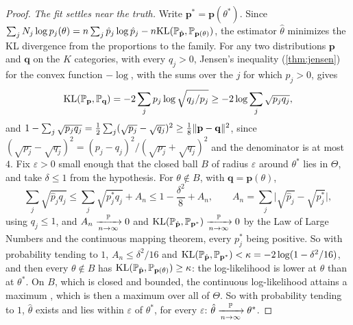 \begin{proof}
\textit{The fit settles near the truth.}
Write $\mathbf{p}^* = \mathbf{p}(\theta^*)$.
Since $\sum_jN_j\log p_j(\theta) = n\sum_j\hat{p}_j\log\hat{p}_j - n\mathrm{KL}(\mathbb{P}_{\hat{\mathbf{p}}}, \mathbb{P}_{\mathbf{p}(\theta)})$, the estimator $\hat{\theta}$ minimizes the KL divergence from the proportions to the family.
For any two distributions $\mathbf{p}$ and $\mathbf{q}$ on the $K$ categories, with every $q_j > 0$, Jensen's inequality (\cref{thm:jensen}) for the convex function $-\log$, with the sums over the $j$ for which $p_j > 0$, gives
\[
\mathrm{KL}(\mathbb{P}_{\mathbf{p}}, \mathbb{P}_{\mathbf{q}}) = -2\sum_j p_j\log\sqrt{q_j/p_j} \geq -2\log\sum_j\sqrt{p_jq_j},
\]
and $1 - \sum_j\sqrt{p_jq_j} = \frac12\sum_j(\sqrt{p_j} - \sqrt{q_j})^2 \geq \frac18\lVert\mathbf{p} - \mathbf{q}\rVert^2$, since $(\sqrt{p_j} - \sqrt{q_j})^2 = (p_j - q_j)^2/(\sqrt{p_j} + \sqrt{q_j})^2$ and the denominator is at most $4$.
Fix $\varepsilon > 0$ small enough that the closed ball $B$ of radius $\varepsilon$ around $\theta^*$ lies in $\Theta$, and take $\delta \leq 1$ from the hypothesis.
For $\theta \notin B$, with $\mathbf{q} = \mathbf{p}(\theta)$,
\[
\sum_j\sqrt{\hat{p}_jq_j} \leq \sum_j\sqrt{p^*_jq_j} + A_n \leq 1 - \frac{\delta^2}{8} + A_n, \qquad A_n = \sum_j\Big|\sqrt{\hat{p}_j} - \sqrt{p^*_j}\Big|,
\]
using $q_j \leq 1$, and $A_n \xrightarrow [n \to \infty ]{\mathbb{P}} 0$ and $\mathrm{KL}(\mathbb{P}_{\hat{\mathbf{p}}}, \mathbb{P}_{\mathbf{p}^*}) \xrightarrow [n \to \infty ]{\mathbb{P}} 0$ by the Law of Large Numbers and the continuous mapping theorem, every $p^*_j$ being positive.
So with probability tending to $1$, $A_n \leq \delta^2/16$ and $\mathrm{KL}(\mathbb{P}_{\hat{\mathbf{p}}}, \mathbb{P}_{\mathbf{p}^*}) < \kappa = -2\log(1 - \delta^2/16)$, and then every $\theta \notin B$ has $\mathrm{KL}(\mathbb{P}_{\hat{\mathbf{p}}}, \mathbb{P}_{\mathbf{p}(\theta)}) \geq \kappa$: the log-likelihood is lower at $\theta$ than at $\theta^*$.
On $B$, which is closed and bounded, the continuous log-likelihood attains a maximum , which is then a maximum over all of $\Theta$.
So with probability tending to $1$, $\hat{\theta}$ exists and lies within $\varepsilon$ of $\theta^*$, for every $\varepsilon$: $\hat{\theta} \xrightarrow [n \to \infty ]{\mathbb{P}} \theta^*$.


\end{proof}
